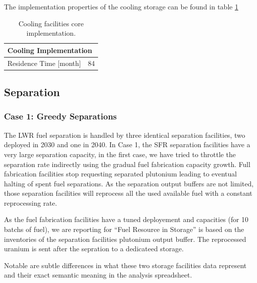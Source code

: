 \documentclass[12pt]{article}
\begin{document}
The implementation properties of the cooling storage can be found in table \ref{tab:cooling_1} 
\begin{table}[h!]
    \centering
    \begin{tabular}{ll}
    \hline
    \multicolumn{2}{l}{Cooling Implementation}  \\
    \hline
    Residence Time [month]   &  84  \\
    \hline
    \end{tabular}
    \caption{Cooling facilities core implementation.}
    \label{tab:cooling_1}
\end{table}

\subsection{Separation}

\subsubsection{Case 1: Greedy Separations}

The LWR fuel separation is handled by three identical separation facilities,
two deployed in 2030 and one in 2040. In Case 1, the SFR separation facilities have a
very large separation capacity, in the first case, we have tried to throttle
the separation rate indirectly using the gradual fuel fabrication capacity
growth. Full fabrication facilities stop requesting separated plutonium
leading to eventual halting of spent fuel separations.
As the separation output buffers are not limited, those separation facilities will
reprocess all the used available fuel with a constant reprocessing rate.

As the fuel fabrication facilities have a tuned deployement and capacities (for 10
batchs of fuel), we are reporting for ``Fuel Resource in Storage'' is based on the
inventories of the separation facilities plutonium output buffer.
The reprocessed uranium is sent after the sepration to a dedicateed storage.

Notable are subtle differences in what these two storage facilities data represent
and their exact semantic meaning in the analysis spreadsheet.
\end{document}
